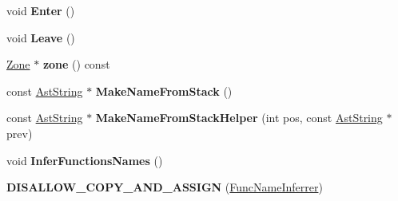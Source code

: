 \begin{DoxyCompactItemize}
\item 
void {\bfseries Enter} ()\hypertarget{classv8_1_1internal_1_1_func_name_inferrer_a10f1720bb184779e004c31205c410827}{}\label{classv8_1_1internal_1_1_func_name_inferrer_a10f1720bb184779e004c31205c410827}

\item 
void {\bfseries Leave} ()\hypertarget{classv8_1_1internal_1_1_func_name_inferrer_a2c2f99c7b0c11c4ffa389e919177377f}{}\label{classv8_1_1internal_1_1_func_name_inferrer_a2c2f99c7b0c11c4ffa389e919177377f}

\item 
\hyperlink{classv8_1_1internal_1_1_zone}{Zone} $\ast$ {\bfseries zone} () const \hypertarget{classv8_1_1internal_1_1_func_name_inferrer_ab5a19a60393122274a9b82461eab8ea5}{}\label{classv8_1_1internal_1_1_func_name_inferrer_ab5a19a60393122274a9b82461eab8ea5}

\item 
const \hyperlink{classv8_1_1internal_1_1_ast_string}{Ast\+String} $\ast$ {\bfseries Make\+Name\+From\+Stack} ()\hypertarget{classv8_1_1internal_1_1_func_name_inferrer_ae41a212dcf83a60601a0554a6009b8e5}{}\label{classv8_1_1internal_1_1_func_name_inferrer_ae41a212dcf83a60601a0554a6009b8e5}

\item 
const \hyperlink{classv8_1_1internal_1_1_ast_string}{Ast\+String} $\ast$ {\bfseries Make\+Name\+From\+Stack\+Helper} (int pos, const \hyperlink{classv8_1_1internal_1_1_ast_string}{Ast\+String} $\ast$prev)\hypertarget{classv8_1_1internal_1_1_func_name_inferrer_a0a33dfaa28ff8d197867b88af98ed966}{}\label{classv8_1_1internal_1_1_func_name_inferrer_a0a33dfaa28ff8d197867b88af98ed966}

\item 
void {\bfseries Infer\+Functions\+Names} ()\hypertarget{classv8_1_1internal_1_1_func_name_inferrer_a19cef999eec1a7830f235e6c201f3232}{}\label{classv8_1_1internal_1_1_func_name_inferrer_a19cef999eec1a7830f235e6c201f3232}

\item 
{\bfseries D\+I\+S\+A\+L\+L\+O\+W\+\_\+\+C\+O\+P\+Y\+\_\+\+A\+N\+D\+\_\+\+A\+S\+S\+I\+GN} (\hyperlink{classv8_1_1internal_1_1_func_name_inferrer}{Func\+Name\+Inferrer})\hypertarget{classv8_1_1internal_1_1_func_name_inferrer_a7c347506dcc8d62074c96538be0efa5d}{}\label{classv8_1_1internal_1_1_func_name_inferrer_a7c347506dcc8d62074c96538be0efa5d}

\end{DoxyCompactItemize}
